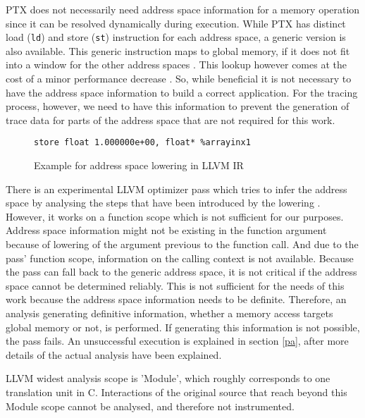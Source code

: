 PTX does not necessarily need address space information for a memory operation since it can be resolved dynamically during execution. While PTX has distinct load (\verb|ld|) and store (\verb|st|) instruction for
each address space, a generic version is also available. This generic instruction maps to global memory, if
it does not fit into a window for the other address spaces \cite{cuda-man}. This lookup however comes at the cost of a minor performance decrease \cite{nvptx-infer-addr-space}. So, while beneficial it is not necessary to
have the address space information to build a correct application. For the tracing process, however, we need to have this information to prevent the generation of trace data for parts of the address space that are not required for this work.

\begin{figure}
	\begin{lstlisting}[style=C]
%arrayinx1 = getelementptr inbounds (float, float* addrspacecast (float addrspace(3)* @_ZZ5saxpyfPfS_iPlS0_E2_x to float*), i64 0, i64 2)
store float 1.000000e+00, float* %arrayinx1
	\end{lstlisting}
	\caption{Example for address space lowering in LLVM IR}
	\label{lowering}
\end{figure}

There is an experimental LLVM optimizer pass which tries to infer the address space by analysing the steps that have been introduced by the lowering \cite{nvptx-infer-addr-space}. However, it works on a function scope which is not sufficient for our purposes. Address space information  might not be existing in the function argument because of lowering of the argument previous to the function call. And due to the pass' function scope, information on the calling context is not available. Because the pass can fall back to the generic address space,
it is not critical if the address space cannot be determined reliably. This is not sufficient for the needs of this work because the address space information needs to be definite.
Therefore, an analysis generating definitive information, whether a memory access targets
global memory or not, is performed. If generating this information is not possible, the pass fails. An unsuccessful execution is  explained in section \ref{pa}, after more details of the actual analysis have been explained.

LLVM widest analysis scope is 'Module', which roughly corresponds to one translation unit in C. Interactions of the original source that reach beyond this Module scope cannot be analysed, and therefore not instrumented.


